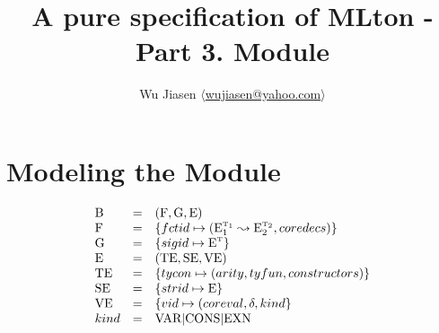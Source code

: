 \documentclass[11pt,a4paper]{article}
\newcommand{\B}  {\textrm{B}}
\newcommand{\E}  {\textrm{E}}
\newcommand{\sT} {\textrm{\tiny T}}
\newcommand{\TE} {\textrm{TE}}
\newcommand{\VE} {\textrm{VE}}
\newcommand{\SE} {\textrm{SE}}
\renewcommand{\G}{\textrm{G}}
\newcommand{\F}  {\textrm{F}}
\newcommand{\VKE}  {\textrm{EXN}}
\newcommand{\VKV}  {\textrm{VAR}}
\newcommand{\VKC}  {\textrm{CONS}}
\newcommand{\braced}[1]{\{#1\}}
\newcommand{\fctor}[2]{#1 \leadsto #2}
\begin{document}
\title {A pure specification of MLton - Part 3. Module}
\author{Wu Jiasen $\langle$\href{mailto:wujiasen@yahoo.com}{wujiasen@yahoo.com}$\rangle$}
\maketitle 
\thispagestyle{fancy}

\section{Modeling the Module}
\[\begin{array}{lcl}
    \B & = & (\F, \G, \E) \\
    \F & = & \braced{fctid \mapsto (\fctor{\E_1^{\sT_1}}{\E_2^{\sT_2}}, coredecs)} \\
    \G & = & \braced{sigid \mapsto \E^\sT} \\
    \E & = & (\TE,\SE,\VE)  \\
    \TE& = & \braced{tycon \mapsto (arity, tyfun, constructors)} \\
    \SE& = & \braced{strid \mapsto \E}  \\ 
    \VE& = & \braced{vid   \mapsto (coreval,\delta, kind} \\
    kind & = & \VKV | \VKC | \VKE \\
\end{array}\]
\end{document}
